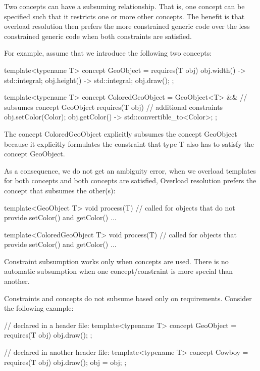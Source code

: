 
Two concepts can have a subsuming relationship. That is, one concept can be specified such that it restricts one or more other concepts. The benefit is that overload resolution then prefers the more constrained generic code over the less constrained generic code when both constraints are satisfied.

For example, assume that we introduce the following two concepts:

\begin{cpp}
template<typename T>
concept GeoObject = requires(T obj) {
	{ obj.width() } -> std::integral;
	{ obj.height() } -> std::integral;
	obj.draw();
};

template<typename T>
concept ColoredGeoObject =
	GeoObject<T> && // subsumes concept GeoObject
	requires(T obj) { // additional constraints
		obj.setColor(Color{});
		{ obj.getColor() } -> std::convertible_to<Color>;
	};
\end{cpp}

The concept ColoredGeoObject explicitly subsumes the concept GeoObject because it explicitly formulates the constraint that type T also has to satisfy the concept GeoObject.

As a consequence, we do not get an ambiguity error, when we overload templates for both concepts and both concepts are satisfied, Overload resolution prefers the concept that subsumes the other(s):

\begin{cpp}
template<GeoObject T>
void process(T) // called for objects that do not provide setColor() and getColor()
{
	...
}

template<ColoredGeoObject T>
void process(T) // called for objects that provide setColor() and getColor()
{
	...
}
\end{cpp}

Constraint subsumption works only when concepts are used. There is no automatic subsumption when one concept/constraint is more special than another.

Constraints and concepts do not subsume based only on requirements. Consider the following example:

\begin{cpp}
// declared in a header file:
template<typename T>
concept GeoObject = requires(T obj) {
						obj.draw();
					};
					
// declared in another header file:
template<typename T>
concept Cowboy = requires(T obj) {
					obj.draw();
					obj = obj;
				};
\end{cpp}


